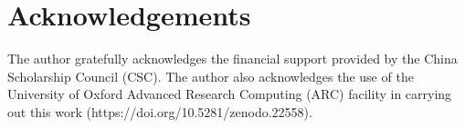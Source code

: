 
\section{Acknowledgements}

The author gratefully acknowledges the financial support provided by the China Scholarship Council (CSC). The author also acknowledges the use of the University of Oxford Advanced Research Computing (ARC) facility in carrying out this work (https://doi.org/10.5281/zenodo.22558).
